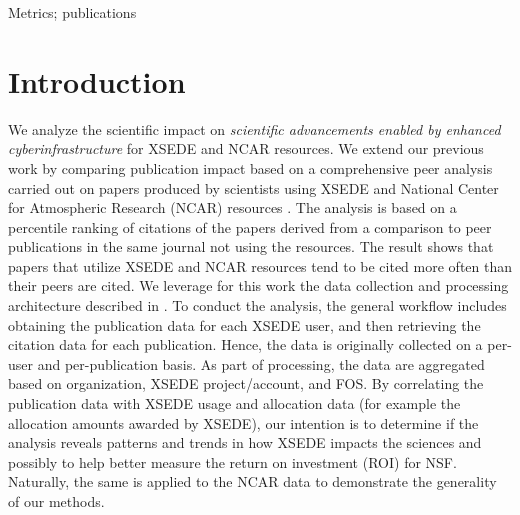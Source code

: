 \documentclass[10pt, conference, compsocconf]{IEEEtran}
\begin{document}
\begin{IEEEkeywords}
Metrics; publications
\end{IEEEkeywords}

\section{Introduction} 


We analyze the scientific impact on {\em scientific advancements enabled by enhanced cyberinfrastructure} for XSEDE and NCAR resources. We extend our previous work \cite{las14impact} by comparing publication impact based on a comprehensive peer analysis carried out on papers produced by scientists using XSEDE and National Center for Atmospheric Research (NCAR) resources \cite{las15cluster-long,las15xsede}. The analysis is based on a percentile ranking of citations of the papers derived from a comparison to peer publications in the same journal not using the resources. The result shows that papers that utilize XSEDE and NCAR resources tend to be cited more often than their peers are cited. We leverage for this work the data collection and processing architecture described in \cite{las14impact,las15cluster-long}. To conduct the analysis, the general workflow includes obtaining the publication data for each XSEDE user, and then retrieving the citation data for each publication. Hence, the data is originally collected on a per-user and per-publication basis. As part of processing, the data are aggregated based on organization, XSEDE project/account, and FOS.  By correlating the publication data with XSEDE usage and allocation data (for example the allocation amounts awarded by XSEDE), our intention is to determine if the analysis reveals patterns and trends in how XSEDE impacts the sciences and possibly to help better measure the return on investment (ROI) for NSF. Naturally, the same is applied to the NCAR data to demonstrate the generality of our methods.
\end{document}
